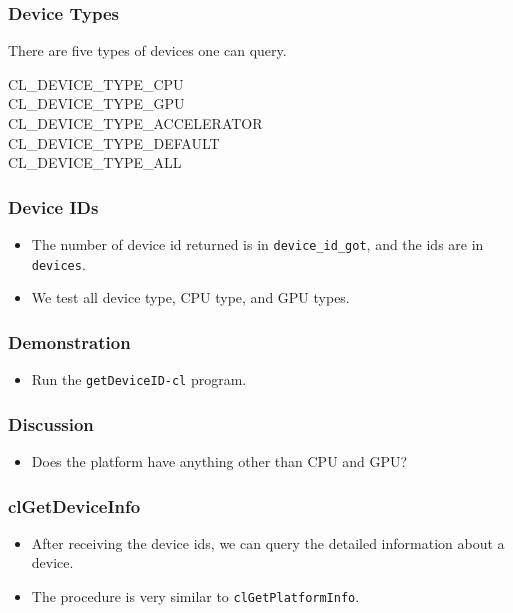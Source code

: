 \documentclass{beamer}
\begin{document}
\begin{frame}
  \frametitle{Device Types}
  There are five types of devices one can query.
  \begin{description}
  \item[CL\_DEVICE\_TYPE\_CPU]
  \item[CL\_DEVICE\_TYPE\_GPU]
  \item[CL\_DEVICE\_TYPE\_ACCELERATOR]
  \item[CL\_DEVICE\_TYPE\_DEFAULT]
  \item[CL\_DEVICE\_TYPE\_ALL]
  \end{description}
\end{frame}


\begin{frame}
  \frametitle{Device IDs}
  \begin{itemize}
  \item The number of device id returned is in {\tt device\_id\_got},
    and the ids are in {\tt devices}.
  \item We test all device type, CPU type, and GPU types.
  \end{itemize}
\end{frame}

\begin{frame}
  \frametitle{Demonstration}
  \begin{itemize}
  \item Run the {\tt getDeviceID-cl} program.
  \end{itemize}
\end{frame}

\begin{frame}
  \frametitle{Discussion}
  \begin{itemize}
  \item Does the platform have anything other than CPU and GPU?
  \end{itemize}
\end{frame}

\begin{frame}
  \frametitle{clGetDeviceInfo}
  \begin{itemize}
  \item After receiving the device ids, we can query the detailed
    information about a device.
  \item The procedure is very similar to {\tt clGetPlatformInfo}.
  \end{itemize}
\end{frame}
\end{document}
